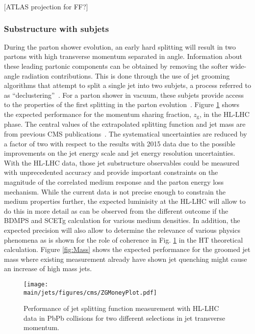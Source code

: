 [ATLAS projection for FF?]


\subsubsection{Substructure with subjets}
During the parton shower evolution, an early hard splitting will result in two partons with high transverse momentum separated in angle. Information about these leading partonic components can be obtained by removing the softer wide-angle radiation contributions. This is done through the use of jet grooming algorithms that attempt to split a single jet into two subjets, a process referred to as ``declustering''~\cite{Ellis:2009me,Butterworth:2008iy,Krohn:2009th,Dasgupta:2013ihk,Larkoski:2014wba}. For a parton shower in vacuum, these subjets provide access to the properties of the first splitting in the parton evolution~\cite{Altarelli:1977zs,Larkoski:2015lea}. Figure \ref{fig:ZG} shows the expected performance for the momentum sharing fraction, $z_{\mathrm{g}}$, in the HL-LHC phase. The central values of the extrapolated splitting function and jet mass are from previous CMS publications~\cite{Sirunyan:2017bsd,Sirunyan:2018gct}. The systematical uncertainties are reduced by a factor of two with respect to the results with 2015 data due to the possible improvements on the jet energy scale and jet energy resolution uncertainties. With the HL-LHC data, those jet substructure observables could be measured with unprecedented accuracy and provide important constraints on the magnitude of the correlated medium response and the parton energy loss mechanism. While the current data is not precise enough to constrain the medium properties further, the expected luminisity at the HL-LHC will allow to do this in more detail as can be observed from the different outcome if the BDMPS and SCETg calculation for various medium densities. In addition, the expected precision will also allow to determine the relevance of various physics phenomena as is shown for the role of coherence in Fig. \ref{fig:ZG} in the HT theoretical calculation. Figure \ref{fig:Mass} shows the expected performance for the groomed jet mass where existing measurement already have shown jet quenching might cause an increase of high mass jets.
\begin{figure}[!ht]
\begin{center}
\texttt{[image: \\main/jets/figures/cms/ZGMoneyPlot.pdf]}
\caption{Performance of jet splitting function measurement with HL-LHC data in PbPb collisions for two different selections in jet transverse momentum. \cite{CMS-FTR-17-002:2017dec}}
\label{fig:ZG}
\end{center}
\end{figure}
